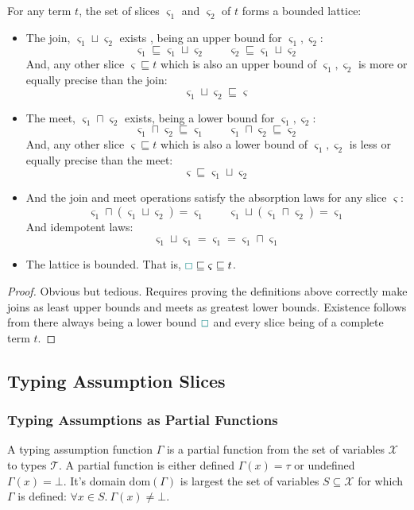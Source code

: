\begin{proposition}
\label{prop:TermLattice}
For any term $t$, the set of slices $\varsigma_1$ and $\varsigma_2$ of $t$ forms a bounded lattice:
\begin{itemize}
\item The join, $\varsigma_1 \sqcup \varsigma_2$ exists , being an upper bound for $\varsigma_1, \varsigma_2$:
\[\varsigma_1 \sqsubseteq \varsigma_1 \sqcup \varsigma_2\qquad \varsigma_2 \sqsubseteq \varsigma_1 \sqcup \varsigma_2\]
And, any other slice $\varsigma \sqsubseteq t$ which is also an upper bound of $\varsigma_1, \varsigma_2$ is more or equally precise than the join:
\[\varsigma_1 \sqcup \varsigma_2 \sqsubseteq \varsigma\]
\item The meet, $\varsigma_1 \sqcap \varsigma_2$ exists, being a lower bound for $\varsigma_1, \varsigma_2$:
\[\varsigma_1 \sqcap \varsigma_2 \sqsubseteq \varsigma_1\qquad  \varsigma_1 \sqcap \varsigma_2 \sqsubseteq\varsigma_2\]
And, any other slice $\varsigma \sqsubseteq t$ which is also a lower bound of $\varsigma_1, \varsigma_2$ is less or equally precise than the meet:
\[ \varsigma \sqsubseteq\varsigma_1 \sqcup \varsigma_2\]
\item And the join and meet operations satisfy the absorption laws for any slice $\varsigma$:
\[\varsigma_1 \sqcap (\varsigma_1 \sqcup \varsigma_2) = \varsigma_1 \qquad \varsigma_1 \sqcup (\varsigma_1 \sqcap \varsigma_2) = \varsigma_1\]
And idempotent laws:
\[\varsigma_1 \sqcup \varsigma_1 = \varsigma_1 = \varsigma_1 \sqcap \varsigma_1\]
\item The lattice is bounded. That is, ${\color{teal}\Box} \sqsubseteq \varsigma \sqsubseteq t$.
\end{itemize}
\end{proposition}
\begin{proof}
Obvious but tedious. Requires proving the definitions above correctly make joins as least upper bounds and meets as greatest lower bounds. Existence follows from there always being a lower bound ${\color{teal}\Box}$ and every slice being of a complete term $t$.
\end{proof}


\subsection{Typing Assumption Slices}
\subsubsection{Typing Assumptions as Partial Functions}
\begin{definition}
A typing assumption function $\Gamma$ is a partial function from the set of variables $\mathcal{X}$ to types $\mathcal{T}$. A partial function is either defined $\Gamma(x) = \tau$ or undefined $\Gamma(x) = \bot$. It's domain $\mathrm{dom}(\Gamma)$ is largest the set of variables $S \subseteq \mathcal{X}$ for which $\Gamma$ is defined: $\forall x \in S.\ \Gamma(x) \neq \bot$.
\end{definition}

